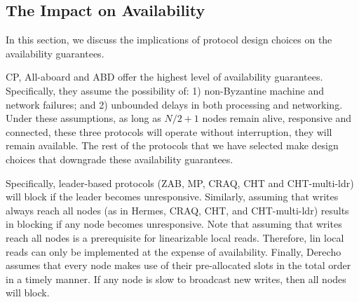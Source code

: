 
\subsection{The Impact on Availability}\label{sec:fail}
In this section, we discuss the implications of protocol design choices on the availability guarantees.



CP, All-aboard and ABD offer the highest level of availability guarantees.
Specifically, they assume the possibility of: 
1) non-Byzantine machine and network failures; and 
2) unbounded delays in both processing and networking. 
Under these assumptions, as long as $N/2 + 1$ nodes remain alive, responsive and connected, these three protocols will operate without interruption, \ie they will remain available.
The rest of the protocols that we have selected 
make design choices that downgrade these availability guarantees.


Specifically, leader-based protocols (ZAB, MP, CRAQ, CHT and CHT-multi-ldr)  will block if the leader becomes unresponsive.
Similarly, assuming that writes always reach all nodes (as in Hermes, CRAQ, CHT, and CHT-multi-ldr) results in blocking if any node becomes unresponsive.
Note that assuming that writes reach all nodes is a prerequisite for  linearizable local reads. Therefore, lin local reads can only be implemented at the expense of availability.
Finally, Derecho assumes that every node makes use of their pre-allocated slots in the total order in a timely manner. If any node is slow to broadcast new writes, then all nodes will block.


